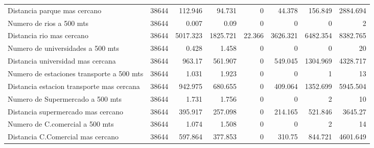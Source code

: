 \begin{table}[!htbp]
{\begin{tabular}{lrrrrrrr}
Distancia parque mas cercano & 38644 & 112.946 & 94.731 & 0 & 44.378 & 156.849 & 2884.694 \\ 
Numero de rios a 500 mts & 38644 & 0.007 & 0.09 & 0 & 0 & 0 & 2 \\ 
Distancia rio mas cercano & 38644 & 5017.323 & 1825.721 & 22.366 & 3626.321 & 6482.354 & 8382.765 \\ 
Numero de universidades a 500 mts & 38644 & 0.428 & 1.458 & 0 & 0 & 0 & 20 \\ 
Distancia universidad mas cercana & 38644 & 963.17 & 561.907 & 0 & 549.045 & 1304.969 & 4328.717 \\ 
Numero de estaciones transporte a 500 mts & 38644 & 1.031 & 1.923 & 0 & 0 & 1 & 13 \\ 
Distancia estacion transporte mas cercana & 38644 & 942.975 & 680.655 & 0 & 409.064 & 1352.699 & 5945.504 \\ 
Numero de Supermercado a 500 mts & 38644 & 1.731 & 1.756 & 0 & 0 & 2 & 10 \\ 
Distancia supermercado mas cercano & 38644 & 395.917 & 257.098 & 0 & 214.165 & 521.846 & 3645.27 \\ 
Numero de C.comercial a 500 mts & 38644 & 1.074 & 1.508 & 0 & 0 & 2 & 14 \\ 
Distancia C.Comercial mas cercano & 38644 & 597.864 & 377.853 & 0 & 310.75 & 844.721 & 4601.649\\ 
\hline
\hline
\end{tabular}
}
\end{table}

